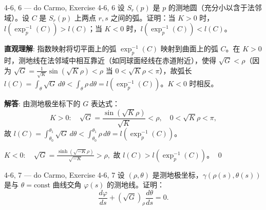 \begin{exercise}{4-6, 6 — do Carmo, Exercise 4-6, 6}
设 $S_r(p)$ 是 $p$ 的测地圆（充分小以含于法邻域）。设 $C$ 是 $S_r(p)$ 上两点 $r,s$ 之间的弧。证明：当 $K>0$ 时，$l(\exp_p^{-1}(C)) > l(C)$；当 $K<0$ 时，$l(\exp_p^{-1}(C)) < l(C)$。
\end{exercise}

\begin{solution}
\textbf{直观理解}: 指数映射将切平面上的弧 $\exp_p^{-1}(C)$ 映射到曲面上的弧 $C$。在 $K>0$ 时，测地线在法邻域中相互靠近（如同球面经线在赤道附近），使得 $\sqrt{G} < \rho$（因为 $\sqrt{G} = \frac{1}{\sqrt{K}}\sin(\sqrt{K}\rho) < \rho$ 当 $0<\sqrt{K}\rho<\pi$），故弧长 $l(C) = \int_\theta \sqrt{G}\, d\theta < \int_\theta \rho\, d\theta = l(\exp_p^{-1}(C))$。$K<0$ 时相反。

\textbf{解答}: 由测地极坐标下的 $G$ 表达式：
\[
K > 0:\quad \sqrt{G} = \frac{\sin(\sqrt{K}\rho)}{\sqrt{K}} < \rho,\quad 0<\sqrt{K}\rho<\pi,
\]
故 $l(C) = \int_{\theta_0}^{\theta_1}\sqrt{G}\, d\theta < \int_{\theta_0}^{\theta_1}\rho\, d\theta = l(\exp_p^{-1}(C))$。

$K < 0:\quad \sqrt{G} = \frac{\sinh(\sqrt{-K}\rho)}{\sqrt{-K}} > \rho,$
故 $l(C) > l(\exp_p^{-1}(C))$。
\qed
\end{solution}

\begin{exercise}{4-6, 7 — do Carmo, Exercise 4-6, 7}
设 $(\rho,\theta)$ 是测地极坐标，$\gamma(\rho(s),\theta(s))$ 是与 $\theta=\mathrm{const}$ 曲线交角 $\varphi(s)$ 的测地线。证明：
\[
\frac{d\varphi}{ds} + (\sqrt{G})_\rho \frac{d\theta}{ds} = 0.
\]
\end{exercise}

